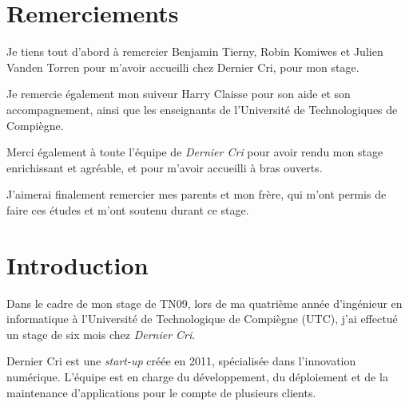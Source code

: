 \section{Remerciements}\label{remerciements}

\bigskip

Je tiens tout d'abord à remercier Benjamin Tierny, Robin Komiwes et
Julien Vanden Torren pour m'avoir accueilli chez Dernier Cri, pour mon
stage.

\bigskip

Je remercie également mon suiveur Harry Claisse pour son aide et son
accompagnement, ainsi que les enseignants de l'Université de
Technologiques de Compiègne.

\bigskip

Merci également à toute l'équipe de \emph{Dernier Cri} pour avoir rendu
mon stage enrichissant et agréable, et pour m'avoir accueilli à bras
ouverts.

\bigskip

J'aimerai finalement remercier mes parents et mon frère, qui m'ont
permis de faire ces études et m'ont soutenu durant ce stage.

\newpage

\section{Introduction}\label{introduction}

\bigskip

Dans le cadre de mon stage de TN09, lors de ma quatrième année
d'ingénieur en informatique à l'Université de Technologique de Compiègne
(UTC), j'ai effectué un stage de six mois chez \emph{Dernier Cri}.

\bigskip

Dernier Cri est une \emph{start-up} créée en 2011, spécialisée dans
l'innovation numérique. L'équipe est en charge du développement, du
déploiement et de la maintenance d'applications pour le compte de
plusieurs clients.

